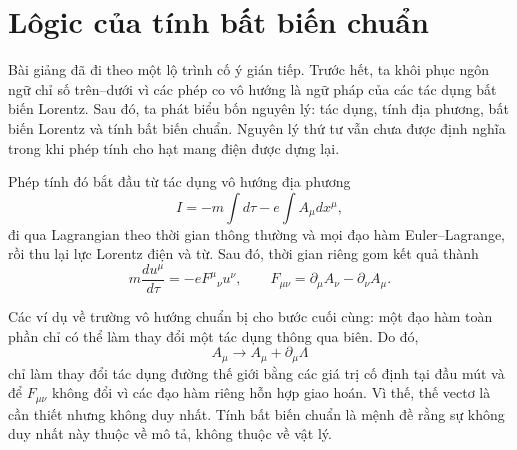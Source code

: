 \section{Lôgic của tính bất biến chuẩn}

Bài giảng đã đi theo một lộ trình cố ý gián tiếp. Trước hết, ta khôi phục ngôn ngữ chỉ số trên--dưới vì các phép co vô hướng là ngữ pháp của các tác dụng bất biến Lorentz. Sau đó, ta phát biểu bốn nguyên lý: tác dụng, tính địa phương, bất biến Lorentz và tính bất biến chuẩn. Nguyên lý thứ tư vẫn chưa được định nghĩa trong khi phép tính cho hạt mang điện được dựng lại.

Phép tính đó bắt đầu từ tác dụng vô hướng địa phương
\begin{equation}
I
=
-m\int d\tau
-e\int A_\mu dx^\mu,
\end{equation}
đi qua Lagrangian theo thời gian thông thường và mọi đạo hàm Euler--Lagrange, rồi thu lại lực Lorentz điện và từ. Sau đó, thời gian riêng gom kết quả thành
\begin{equation}
m\frac{du^\mu}{d\tau}
=
-eF^\mu{}_\nu u^\nu,
\qquad
F_{\mu\nu}
=
\partial_\mu A_\nu-\partial_\nu A_\mu.
\end{equation}

Các ví dụ về trường vô hướng chuẩn bị cho bước cuối cùng: một đạo hàm toàn phần chỉ có thể làm thay đổi một tác dụng thông qua biên. Do đó,
\begin{equation}
A_\mu\longrightarrow A_\mu+\partial_\mu\Lambda
\end{equation}
chỉ làm thay đổi tác dụng đường thế giới bằng các giá trị cố định tại đầu mút và để \(F_{\mu\nu}\) không đổi vì các đạo hàm riêng hỗn hợp giao hoán. Vì thế, thế vectơ là cần thiết nhưng không duy nhất. Tính bất biến chuẩn là mệnh đề rằng sự không duy nhất này thuộc về mô tả, không thuộc về vật lý.